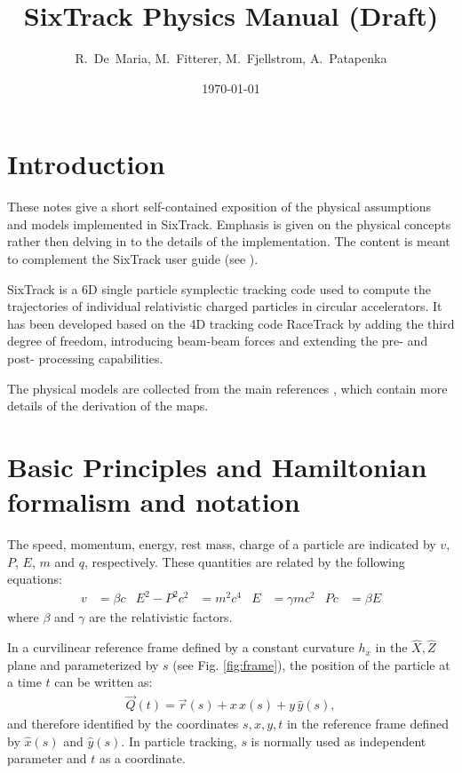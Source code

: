 \documentclass[english]{article}
\begin{document}
\author{R.~De~Maria, M.~Fitterer, M.~Fjellstrom, A.~Patapenka}
\title{SixTrack Physics Manual (Draft)}
\date{\today}

\maketitle

\tableofcontents
\newpage

\section{Introduction}

These notes give a short self-contained exposition of the physical assumptions
and models implemented in SixTrack. Emphasis is given on the physical concepts
rather then delving in to the details of the implementation.  The content is
meant to complement the SixTrack user guide (see \cite{user_guide}).

SixTrack is a 6D single particle symplectic tracking code used to compute the
trajectories of individual relativistic charged particles in circular
accelerators. It has been developed based on the 4D tracking code RaceTrack
\cite{racetrack} by adding the third degree of freedom, introducing beam-beam
forces and extending the pre- and post- processing capabilities.

The physical models are collected from the main references
\cite{ripken85,barber87,ripken95,heinemann95,barber96,beam_beam,rf_multipoles},
which contain more details of the derivation of the maps.

\section{Basic Principles and Hamiltonian formalism and notation}


The speed, momentum, energy, rest mass, charge of a particle are indicated
by $v$, $P$, $E$, $m$ and $q$, respectively.  These quantities are
related by the following equations:
\begin{align}
  v&=\beta c &
  E^2-P^2c^2&=m^2c^4 &
  E & = \gamma mc^2 &
  Pc & =\beta E
\end{align}
where $\beta$ and $\gamma$ are the relativistic factors.

In a curvilinear reference frame defined by a constant curvature $h_x$ in the
$\hat X, \hat Z$ plane and parameterized by $s$  (see Fig. \ref{fig:frame}), the
position of the particle at a time $t$ can be written as:
\begin{align}
  \vec Q(t)= \vec r(s) + x \,\hat x(s) + y\, \hat y(s),
\end{align}
and therefore identified by the coordinates $s, x, y, t$ in the reference frame
defined by $\hat x(s)$ and $\hat y(s)$. In particle tracking, $s$ is normally
used as independent parameter and $t$ as a coordinate.
\end{document}
